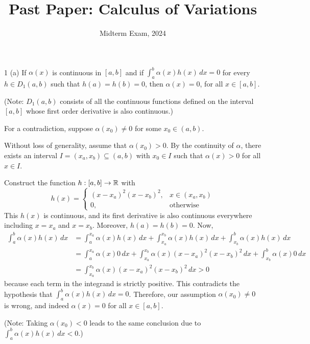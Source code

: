 \documentclass[11pt]{penrose}
\title{Past Paper: Calculus of Variations}
\subtitle{Midterm Exam, 2024}
\begin{document}
\maketitle
\warningtext

\begin{problem}{1 (a)}
    If $\alpha(x)$ is continuous in $[a,b]$ and if $\int_a^b \alpha(x) h(x) \,dx = 0$ for every $h \in D_{1}(a,b)$ such that $h(a) = h(b) = 0$, then $\alpha(x) = 0$, for all $x \in [a,b]$.

    (Note: $D_{1}(a,b)$ consists of all the continuous functions defined on the interval $[a,b]$ whose first order derivative is also continuous.)

    \solution For a contradiction, suppose $\alpha(x_0) \neq 0$ for some $x_0 \in (a,b)$.

    Without loss of generality, assume that $\alpha(x_0) > 0$. By the continuity of $\alpha$, there exists an interval $I = (x_a, x_b) \subseteq (a,b)$ with $x_0 \in I$ such that $\alpha(x) > 0$ for all $x \in I$.

    Construct the function $h:[a,b] \to \mathbb{R}$ with
    \begin{equation*}
        h(x) =
        \begin{cases}
            (x - x_a)^2 (x - x_b)^2, & x \in (x_a, x_b) \\
            0, & \text{otherwise}
        \end{cases}
    \end{equation*}
    This $h(x)$ is continuous, and its first derivative is also continuous everywhere including $x = x_a$ and $x = x_b$. Moreover, $h(a) = h(b) = 0$. Now,
    \begin{align*}
        \int_a^b \alpha(x) h(x) \,dx
        &= \int_a^{x_a} \alpha(x) h(x) \,dx
        + \int_{x_a}^{x_b} \alpha(x) h(x) \,dx
        + \int_{x_b}^b \alpha(x) h(x) \,dx\\
        &= \int_a^{x_a} \alpha(x) 0 \,dx
        + \int_{x_a}^{x_b} \alpha(x) (x - x_a)^2 (x - x_b)^2 \,dx
        + \int_{x_b}^b \alpha(x) 0 \,dx\\
        &= \int_{x_a}^{x_b} \alpha(x) (x - x_a)^2 (x - x_b)^2 \,dx
        > 0
    \end{align*}
    because each term in the integrand is strictly positive. This contradicts the hypothesis that $\int_a^b \alpha(x) h(x) \,dx = 0$. Therefore, our assumption $\alpha(x_0) \neq 0$ is wrong, and indeed $\alpha(x) = 0$ for all $x \in [a,b]$.

    (Note: Taking $\alpha(x_0) < 0$ leads to the same conclusion due to $\int_a^b \alpha(x) h(x) \,dx < 0$.)
\end{problem}
\end{document}
